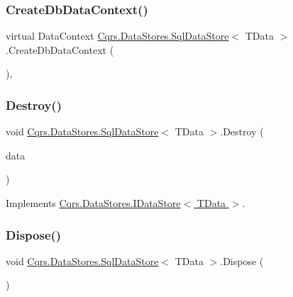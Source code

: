 \subsubsection{\texorpdfstring{Create\+Db\+Data\+Context()}{CreateDbDataContext()}}
{\footnotesize\ttfamily virtual Data\+Context \hyperlink{classCqrs_1_1DataStores_1_1SqlDataStore}{Cqrs.\+Data\+Stores.\+Sql\+Data\+Store}$<$ T\+Data $>$.Create\+Db\+Data\+Context (\begin{DoxyParamCaption}{ }\end{DoxyParamCaption})\hspace{0.3cm}{\ttfamily [protected]}, {\ttfamily [virtual]}}

\mbox{\label{classCqrs_1_1DataStores_1_1SqlDataStore_a5ec396c9eb202c8de931c1546c721ca3}} 
\subsubsection{\texorpdfstring{Destroy()}{Destroy()}}
{\footnotesize\ttfamily void \hyperlink{classCqrs_1_1DataStores_1_1SqlDataStore}{Cqrs.\+Data\+Stores.\+Sql\+Data\+Store}$<$ T\+Data $>$.Destroy (\begin{DoxyParamCaption}\item[{T\+Data}]{data }\end{DoxyParamCaption})}



Implements \hyperlink{interfaceCqrs_1_1DataStores_1_1IDataStore_aa7ade96f2f3151d5353cf7bdbb2baec5}{Cqrs.\+Data\+Stores.\+I\+Data\+Store$<$ T\+Data $>$}.

\mbox{\label{classCqrs_1_1DataStores_1_1SqlDataStore_a975c0087677987dffccc4f0ffa97e691}} 
\subsubsection{\texorpdfstring{Dispose()}{Dispose()}}
{\footnotesize\ttfamily void \hyperlink{classCqrs_1_1DataStores_1_1SqlDataStore}{Cqrs.\+Data\+Stores.\+Sql\+Data\+Store}$<$ T\+Data $>$.Dispose (\begin{DoxyParamCaption}{ }\end{DoxyParamCaption})}



